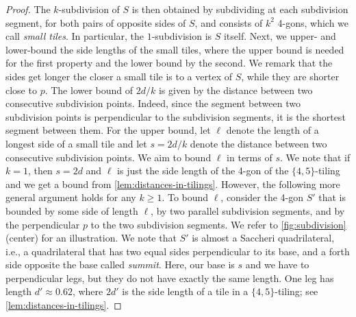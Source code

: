 \begin{proof}
    The $ k $-subdivision of $ S $ is then obtained by subdividing at each subdivision segment, for both pairs of opposite sides of $ S $, and consists of $ k^2 $ 4-gons, which we call \emph{small tiles}.
    In particular, the $ 1 $-subdivision is $ S $ itself.
%
    Next, we upper- and lower-bound the side lengths of the small tiles, where the upper bound is needed for the first property and the lower bound by the second.
    We remark that the sides get longer the closer a small tile is to a vertex of $ S $, while they are shorter close to $ p $. 
    The lower bound of $ 2d / k $ is given by the distance between two consecutive subdivision points.
    Indeed, since the segment between two subdivision points is perpendicular to the subdivision segments, it is the shortest segment between them.
%
%     
%
    For the upper bound, let $ \ell $ denote the length of a longest side of a small tile and let $ s = 2d / k $ denote the distance between two consecutive subdivision points.
    We aim to bound $ \ell $ in terms of $ s $.
    We note that if $k = 1$, then $ s = 2d $ and $ \ell $ is just the side length of the 4-gon of the $\{4, 5\}$-tiling and we get a bound from \cref{lem:distances-in-tilings}.
    However, the following more general argument holds for any $k \ge 1$.
    To bound $\ell$, consider the 4-gon $S'$ that is bounded by some side of length $ \ell $, by two parallel subdivision segments, and by the perpendicular $ p $ to the two subdivision segments.
    We refer to \cref{fig:subdivision} (center) for an illustration.
%
    We note that $S'$ is almost a Saccheri quadrilateral, i.e., a quadrilateral that has two equal sides perpendicular to its base, and a forth side opposite the base called \emph{summit}. 
    Here, our base is $ s $ and we have to perpendicular legs, but they do not have exactly the same length.
    One leg has length $ d' \approx 0.62 $, where $ 2d' $ is the side length of a tile in a $ \{ 4, 5\} $-tiling; see \cref{lem:distances-in-tilings}.

\end{proof}
